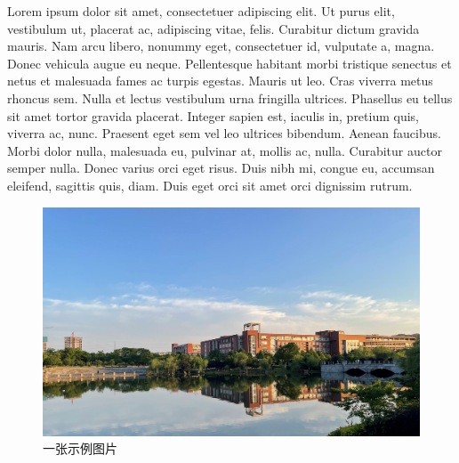 \xiaosi
Lorem ipsum \citep{agrawal2011challenges} dolor sit amet, consectetuer adipiscing elit. Ut purus elit, vestibulum ut,
placerat ac, adipiscing vitae, felis. Curabitur dictum gravida mauris. Nam arcu libero, nonummy
eget, consectetuer id, vulputate a, magna. Donec vehicula augue eu neque. Pellentesque habitant
morbi tristique senectus et netus et malesuada fames ac turpis egestas. Mauris ut leo. Cras
viverra metus rhoncus sem. Nulla et lectus vestibulum urna fringilla ultrices. Phasellus eu tellus
sit amet tortor gravida placerat. Integer sapien est, iaculis in, pretium quis, viverra ac, nunc.
Praesent eget sem vel leo ultrices bibendum. Aenean faucibus. Morbi dolor nulla, malesuada eu,
pulvinar at, mollis ac, nulla. Curabitur auctor semper nulla. Donec varius orci eget risus. Duis
nibh mi, congue eu, accumsan eleifend, sagittis quis, diam\cite{wu2013data}. Duis eget orci sit amet orci dignissim
rutrum.\cite{zhang2016}

\begin{figure}[H]
    \centering
    \includegraphics[width=0.8\linewidth]{img/fig1.jpg}
    \caption{一张示例图片}
    \label{fig:figure1}
\end{figure}

\lipsum[1-2]

